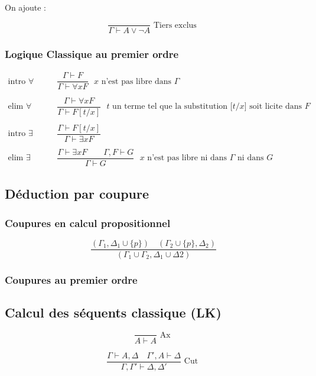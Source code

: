 \documentclass[french]{article}
\begin{document}
On ajoute : 

\[\dfrac{}{\Gamma\vdash A\vee\neg A}\text{ Tiers exclus }\]

\subsubsection{Logique Classique au premier ordre}

\begin{align*}
\text{intro $\forall$} &\qquad\dfrac{\Gamma\vdash F}{\Gamma\vdash\forall x F}\text{ $x$ n'est pas libre dans $\Gamma$}\\
\\
\text{elim $\forall$} &\qquad\dfrac{\Gamma\vdash\forall x F}{\Gamma\vdash F[t/x]}\text{ $t$ un terme tel que la substitution [$t$/$x$] soit licite dans $F$}\\
\\
\text{intro $\exists$} &\qquad\dfrac{\Gamma\vdash F[t/x]}{\Gamma\vdash\exists x F}\\
\\
\text{elim $\exists$} &\qquad\dfrac{\Gamma\vdash\exists x F\qquad\Gamma, F\vdash G}{\Gamma\vdash G}\text{ $x$ n'est pas libre ni dans $\Gamma$ ni dans $G$}
\end{align*}

\subsection{Déduction par coupure}

\subsubsection{Coupures en calcul propositionnel}

\[\dfrac{(\Gamma_1,\Delta_1\cup\{p\}) \quad (\Gamma_2\cup\{p\}, \Delta_2)}{(\Gamma_1\cup\Gamma_2, \Delta_1\cup\Delta2)}\]


\subsubsection{Coupures au premier ordre}


\subsection{Calcul des séquents classique (LK)}

\[\dfrac{}{A \vdash A} \text{ Ax }\]

\[\dfrac{\Gamma \vdash A,\Delta \quad \Gamma',A \vdash \Delta}{\Gamma,\Gamma' \vdash \Delta, \Delta'} \text{ Cut }\]
\end{document}
